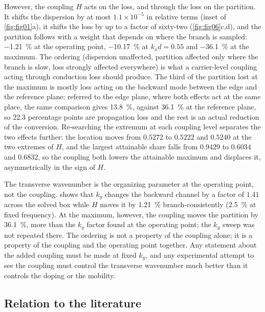 However, the coupling $H$ acts on the loss, and through the loss on the partition.  It
shifts the dispersion by at most $1.1\times10^{-5}$ in relative terms
(inset of \cref{fig:fig01}a), it shifts the loss by up to a factor of sixty-two
(\cref{fig:fig06}c,d), and the partition follows with a weight that depends on
where the branch is sampled: \SI{-1.21}{\percent} at the operating point,
\SI{-10.17}{\percent} at $k_xd=0.55$ and \SI{-36.1}{\percent} at the maximum.  The ordering (dispersion unaffected,
partition affected only where the branch is slow, loss strongly affected
everywhere) is what a carrier-level coupling acting through conduction loss
should produce.  The third of the partition lost at the maximum is mostly
loss acting on the backward mode between the edge and the reference plane:
referred to the edge plane, where both effects act at the same place, the same
comparison gives \SI{13.8}{\percent}, against \SI{36.1}{\percent} at the reference plane, so
22.3 percentage points are propagation loss and the rest is an actual reduction of the conversion.  Re-searching the extremum at each coupling level separates the
two effects further: the location moves from $0.5272$ to $0.5222$ and $0.5240$
at the two extremes of $H$, and the largest attainable share falls from $0.9429$
to $0.6034$ and $0.6832$, so the coupling both lowers the attainable maximum and displaces it, asymmetrically in the sign of $H$.

The transverse wavenumber is the organizing parameter at the operating point,
not the coupling.   shows that $k_y$ changes the backward
channel by a factor of $1.41$ across the solved box while $H$ moves it by
\SI{1.21}{\percent} branch-consistently (\SI{2.5}{\percent} at fixed frequency).
At the maximum, however, the coupling moves the partition by \SI{36.1}{\percent}, more than the
$k_y$ factor found at the operating point; the $k_y$ sweep was not repeated there.  The ordering is not a property of the coupling alone; it is a
property of the coupling and the operating point together.
Any statement about the added coupling must be made at fixed $k_y$,
and any experimental attempt to see the coupling must control the transverse
wavenumber much better than it controls the doping or the mobility.

\subsection{Relation to the literature}
\label{sec:disc_literature}

